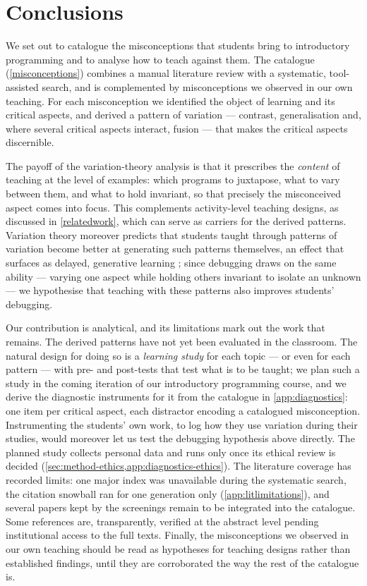 \mode*
\section{Conclusions}
\label{conclusions}

We set out to catalogue the misconceptions that students bring to introductory
programming and to analyse how to teach against them. The catalogue
(\cref{misconceptions}) combines a manual literature review with a systematic,
tool-assisted search, and is complemented by misconceptions we observed in our
own teaching. For each misconception we identified the object of learning and
its critical aspects, and derived a pattern of variation --- contrast,
generalisation and, where several critical aspects interact, fusion --- that
makes the critical aspects discernible.

The payoff of the variation-theory analysis is that it prescribes the
\emph{content} of teaching at the level of examples: which programs to
juxtapose, what to vary between them, and what to hold invariant, so that
precisely the misconceived aspect comes into focus. This complements
activity-level teaching designs, as discussed in \cref{relatedwork}, which can
serve as carriers for the derived patterns. Variation theory moreover predicts
that students taught through patterns of variation become better at generating
such patterns themselves, an effect that surfaces as delayed, generative
learning \autocite[pp.~227--228]{NCOL}; since debugging draws on the same
ability --- varying one aspect while holding others invariant to isolate an
unknown --- we hypothesise that teaching with these patterns also improves
students' debugging.

Our contribution is analytical, and its limitations mark out the work that
remains. The derived patterns have not yet been evaluated in the classroom.
The natural design for doing so is a \emph{learning study}
\autocite[Ch.~7]{NCOL} for each topic --- or even for each pattern --- with
pre- and post-tests that test what is to be taught; we plan such a study in
the coming iteration of our introductory programming course, and we derive
the diagnostic instruments for it from the catalogue in
\cref{app:diagnostics}: one item per critical aspect, each distractor
encoding a catalogued misconception. Instrumenting
the students' own work, to log how they use variation during their studies,
would moreover let us test the debugging hypothesis above directly.
The planned study collects personal data and runs only once its ethical
review is decided (\cref{sec:method-ethics,app:diagnostics-ethics}).
The literature coverage has recorded
limits: one major index was unavailable during the systematic search, the
citation snowball ran for one generation only (\cref{app:litlimitations}),
and several papers kept by the screenings remain to be integrated into the
catalogue. Some
references are, transparently, verified at the abstract level pending
institutional access to the full texts. Finally, the misconceptions we
observed in our own teaching should be read as hypotheses for teaching
designs rather than established findings, until they are corroborated the
way the rest of the catalogue is.

